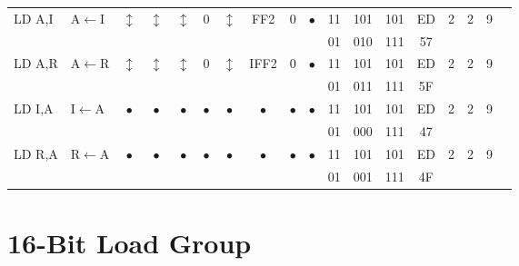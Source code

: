 \documentclass[oneside,a4paper]{book}
\begin{document}
{\begin{tabular}{llcccccccccccccccl}
		LD A,I & A$\leftarrow$I & 
			$\updownarrow$ & $\updownarrow$ & $\updownarrow$ & 0 & $\updownarrow$ & {\tiny FF2} & 0 & $\bullet$ & 
			11 & 101 & 101 & 
			ED & 2 & 
			2 & 9 & \\ 
		\multicolumn{10}{c}{} & 01 & 010 & 111 & 57 & & & & \\[4pt]

		LD A,R & A$\leftarrow$R & 
			$\updownarrow$ & $\updownarrow$ & $\updownarrow$ & 0 & $\updownarrow$ & {\tiny IFF2} & 0 & $\bullet$ & 
			11 & 101 & 101 & 
			ED & 2 & 
			2 & 9 & \\ 
		\multicolumn{10}{c}{} & 01 & 011 & 111 & 5F & & & & \\[4pt]

		LD I,A & I$\leftarrow$A & 
			$\bullet$ & $\bullet$ & $\bullet$ & $\bullet$ & $\bullet$ & $\bullet$ & $\bullet$ & $\bullet$ & 
			11 & 101 & 101 & 
			ED & 2 & 
			2 & 9 & \\ 
		\multicolumn{10}{c}{} & 01 & 000 & 111 & 47 & & & & \\[4pt]

		LD R,A & R$\leftarrow$A & 
			$\bullet$ & $\bullet$ & $\bullet$ & $\bullet$ & $\bullet$ & $\bullet$ & $\bullet$ & $\bullet$ & 
			11 & 101 & 101 & 
			ED & 2 & 
			2 & 9 & \\ 
		\multicolumn{10}{c}{} & 01 & 001 & 111 & 4F & & & & \\[4pt]

	\hline

	\end{tabular}
}


\section{16-Bit Load Group}
\end{document}
